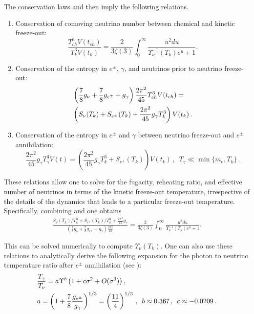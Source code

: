 The conservation laws  and  then imply the following relations.
\begin{enumerate}
\item Conservation of comoving neutrino number between chemical and kinetic freeze-out:
\begin{equation}\label{modindeq1}
\frac{T_{ch}^3V(t_{ch})}{T_k^3V(t_k)}=\frac{2}{3\zeta(3)}\int_0^\infty \frac{u^2 du}{\Upsilon_\nu^{-1}(T_k)e^u+1}.
\end{equation}
\item Conservation of the entropy in $e^\pm$, $\gamma$, and neutrinos prior to neutrino freeze-out:
\begin{align}\label{modindeq2}
&\left(\frac{7}{8}g_\nu+\frac{7}{8}g_{e^\pm} +g_\gamma \right)\frac{2\pi^2}{45} T_{ch}^3V(t_{ch})=\\
&\left(S_{\nu}(T_k)+S_{e^\pm}(T_k)+\frac{2\pi^2}{45}g_\gamma T_k^3\right)V(t_k)\,.\notag
\end{align}
\item Conservation of the entropy in $e^\pm$ and $\gamma$ between neutrino freeze-out and $e^\pm$ annihilation:
\begin{equation}\label{modindeq3}
\frac{2 \pi^2}{45}g_\gamma T_{\gamma}^3 V(t)=\left(\frac{2\pi^2}{45}g_\gamma T_k^3+S_{e^\pm}(T_k)\right)V(t_k)\,, \,\,\, T_\gamma\ll \min\{m_e, T_k\}\,.
\end{equation}
\end{enumerate}

These relations allow one to solve for the fugacity, reheating ratio, and effective number of neutrinos in terms of the kinetic freeze-out temperature, irrespective of the details of the dynamics that leads to a particular freeze-out temperature. Specifically, combining  and  one obtains
\begin{align}
 \frac{S_{\nu}(T_k)/T_k^3+S_{e^\pm}(T_k)/T_k^3+\frac{2\pi^2}{45}g_\gamma }{\left(\frac{7}{8}g_\nu+\frac{7}{8}g_{e^\pm} +g_\gamma \right)\frac{2\pi^2}{45} }=\frac{2}{3\zeta(3)}\int_0^\infty \frac{u^2 du}{\Upsilon_\nu^{-1}(T_k)e^u+1}.
\end{align}

This can be solved numerically to compute $\Upsilon_\nu(T_k)$. One can also use these relations to analytically derive the following expansion for the photon to neutrino temperature ratio after $e^\pm$ annihilation (see \cite{Birrell:2012gg}):
\begin{align}\label{eq:UpsilonRatio}
&\frac{T_\gamma}{T_\nu}=a\Upsilon^{b}\left(1+c\sigma^2+O(\sigma^3)\right),\\
\label{value_a}
&a=\left(1+\frac{7}{8}\frac{g_{e^\pm}}{g_\gamma}\right)^{1/3}=\left(\frac{11}{4}\right)^{1/3}\,,\,\,\,b\approx 0.367\,, \,\,\,c\approx -0.0209\,.\notag
\end{align}

